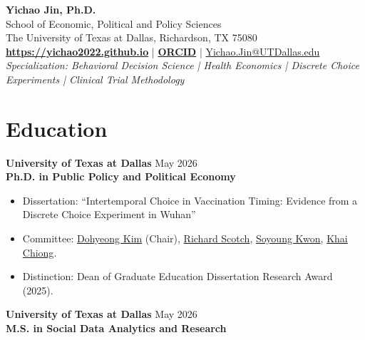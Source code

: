 \documentclass[11pt, letterpaper]{article}
\begin{document}
\thispagestyle{empty}
\pagestyle{empty}

\begin{center}
    {\huge \textbf{Yichao Jin, Ph.D.}} \\
    \vspace{0.5em}
    School of Economic, Political and Policy Sciences \\
    The University of Texas at Dallas, Richardson, TX 75080 \\
    \vspace{0.5em}
    \href{https://yichao2022.github.io}{\textbf{https://yichao2022.github.io}} \quad | \quad \href{https://orcid.org/0009-0003-7667-5143}{\textbf{ORCID}} \quad | \quad \href{mailto:Yichao.Jin@UTDallas.edu}{Yichao.Jin@UTDallas.edu} \\
    \vspace{0.5em}
    \textit{Specialization: Behavioral Decision Science \;|\; Health Economics \;|\; Discrete Choice Experiments \;|\; Clinical Trial Methodology}
\end{center}

\vspace{0.5em}
\noindent\hrulefill

\section*{Education}
\textbf{University of Texas at Dallas} \hfill May 2026 \\
\textbf{Ph.D. in Public Policy and Political Economy}
\begin{itemize}[noitemsep, topsep=0pt, label={-}]
    \item Dissertation: ``Intertemporal Choice in Vaccination Timing: Evidence from a Discrete Choice Experiment in Wuhan''
    \item Committee: \href{https://profiles.utdallas.edu/dohyeong.kim}{Dohyeong Kim} (Chair), \href{https://profiles.utdallas.edu/richard.scotch}{Richard Scotch}, \href{https://profiles.utdallas.edu/soyoung.kwon}{Soyoung Kwon}, \href{https://jindal.utdallas.edu/faculty/khai-chiong/}{Khai Chiong}.
    \item Distinction: Dean of Graduate Education Dissertation Research Award (2025).
\end{itemize}

\vspace{0.5em}
\noindent \textbf{University of Texas at Dallas} \hfill May 2026 \\
\textbf{M.S. in Social Data Analytics and Research}
\end{document}
